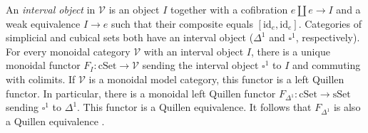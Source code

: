 \documentclass[reqno]{amsart}
\theoremstyle{definition}
\theoremstyle{remark}
\newcommand{\fs}[1]{\mathrm{#1}}
\newcommand{\cat}[1]{\mathcal{#1}}
\newcommand{\id}{\fs{id}}
\newcommand{\sSet}{\fs{sSet}}
\newcommand{\cSet}{\fs{cSet}}
\numberwithin{figure}{section}
\begin{document}
An \emph{interval object} in $\cat{V}$ is an object $I$ together with a cofibration $e \amalg e \to I$ and a weak equivalence $I \to e$ such that their composite equals $[\id_e,\id_e]$.
Categories of simplicial and cubical sets both have an interval object ($\Delta^1$ and $\square^1$, respectively).
For every monoidal category $\cat{V}$ with an interval object $I$, there is a unique monoidal functor $F_I : \cSet \to \cat{V}$ sending the interval object $\square^1$ to $I$ and commuting with colimits.
If $\cat{V}$ is a monoidal model category, this functor is a left Quillen functor.
In particular, there is a monoidal left Quillen functor $F_{\Delta^1} : \cSet \to \sSet$ sending $\square^1$ to $\Delta^1$.
This functor is a Quillen equivalence. %
It follows that $F_{\Delta^1}$ is also a Quillen equivalence \cite[Remark~A.3.2.6]{lurie-topos}.



\end{document}
